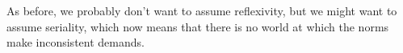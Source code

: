     

As before, we probably don't want to assume reflexivity, but we might want to
assume seriality, which now means that there is no world at which the norms make
inconsistent demands.

